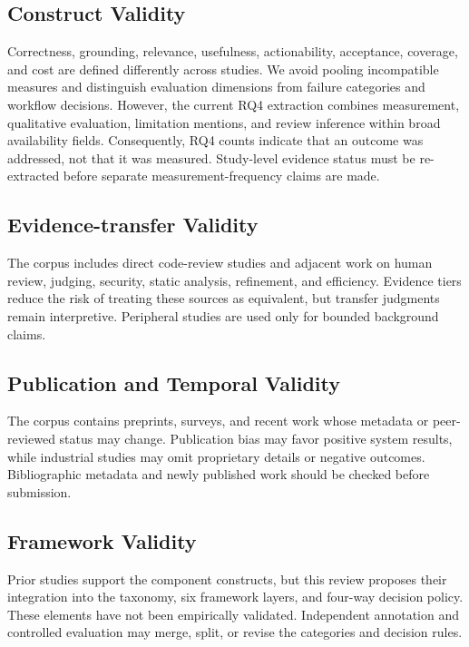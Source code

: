 \documentclass[10pt]{article}
\begin{document}
\subsection{Construct Validity}

Correctness, grounding, relevance, usefulness, actionability, acceptance, coverage, and cost are defined differently across studies. We avoid pooling incompatible measures and distinguish evaluation dimensions from failure categories and workflow decisions. However, the current RQ4 extraction combines measurement, qualitative evaluation, limitation mentions, and review inference within broad availability fields. Consequently, RQ4 counts indicate that an outcome was addressed, not that it was measured. Study-level evidence status must be re-extracted before separate measurement-frequency claims are made.

\subsection{Evidence-transfer Validity}

The corpus includes direct code-review studies and adjacent work on human review, judging, security, static analysis, refinement, and efficiency. Evidence tiers reduce the risk of treating these sources as equivalent, but transfer judgments remain interpretive. Peripheral studies are used only for bounded background claims.

\subsection{Publication and Temporal Validity}

The corpus contains preprints, surveys, and recent work whose metadata or peer-reviewed status may change. Publication bias may favor positive system results, while industrial studies may omit proprietary details or negative outcomes. Bibliographic metadata and newly published work should be checked before submission.

\subsection{Framework Validity}

Prior studies support the component constructs, but this review proposes their integration into the taxonomy, six framework layers, and four-way decision policy. These elements have not been empirically validated. Independent annotation and controlled evaluation may merge, split, or revise the categories and decision rules.
\end{document}
